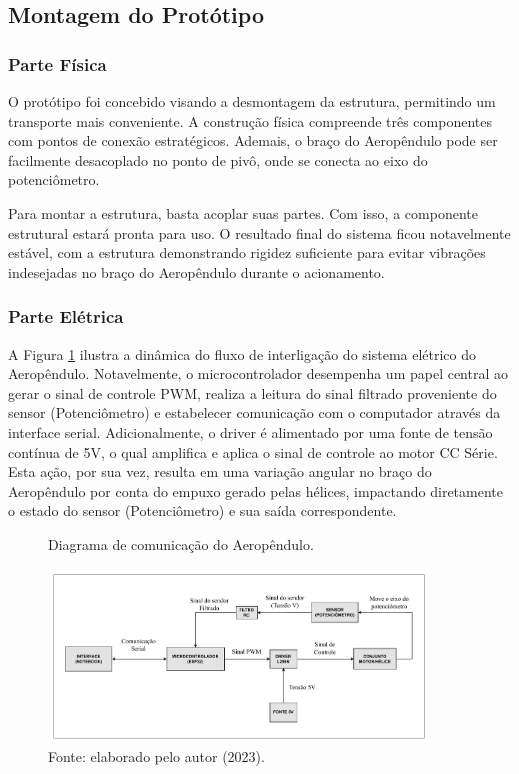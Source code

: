 \subsection{Montagem do Protótipo}

\subsubsection{Parte Física}

O protótipo foi concebido visando a desmontagem da estrutura, permitindo um transporte mais conveniente. A construção física compreende três componentes com pontos de conexão estratégicos. Ademais, o braço do Aeropêndulo pode ser facilmente desacoplado no ponto de pivô, onde se conecta ao eixo do potenciômetro.

Para montar a estrutura, basta acoplar suas partes. Com isso, a componente estrutural estará pronta para uso. O resultado final do sistema ficou notavelmente estável, com a estrutura demonstrando rigidez suficiente para evitar vibrações indesejadas no braço do Aeropêndulo durante o acionamento.

\subsubsection{Parte Elétrica}


A Figura \ref{fig3:image_11} ilustra a dinâmica do fluxo de interligação do sistema elétrico do Aeropêndulo. Notavelmente, o microcontrolador desempenha um papel central ao gerar o sinal de controle PWM, realiza a leitura do sinal filtrado proveniente do sensor (Potenciômetro) e estabelecer comunicação com o computador através da interface serial. Adicionalmente, o driver é alimentado por uma fonte de tensão contínua de 5V, o qual amplifica e aplica o sinal de controle ao motor CC Série. Esta ação, por sua vez, resulta em uma variação angular no braço do Aeropêndulo por conta do empuxo gerado pelas hélices, impactando diretamente o estado do sensor (Potenciômetro) e sua saída correspondente.

\begin{figure}[!h]
	\centering
	\caption{Diagrama de comunicação do Aeropêndulo.}
	\includegraphics[width=0.9\textwidth, page=1]{Capitulos/3_hardware_softwares/3_figuras/diag_aerop.pdf}
	\caption*{Fonte: elaborado pelo autor (2023).}
	\label{fig3:image_11}
\end{figure}



